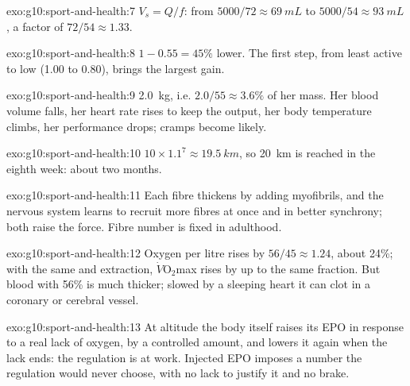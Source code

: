 \begin{solution}{exo:g10:sport-and-health:7}
$V_s = Q/f$: from $5000/72 \approx \qty{69}{mL}$ to $5000/54 \approx
\qty{93}{mL}$, a factor of $72/54 \approx 1.33$.
\end{solution}

\begin{solution}{exo:g10:sport-and-health:8}
$1 - 0.55 = 45\%$ lower. The first step, from least active to low
(1.00 to 0.80), brings the largest gain.
\end{solution}

\begin{solution}{exo:g10:sport-and-health:9}
\qty{2.0}{kg}, i.e. $2.0/55 \approx 3.6\%$ of her mass. Her blood
volume falls, her heart rate rises to keep the output, her body
temperature climbs, her performance drops; cramps become likely.
\end{solution}

\begin{solution}{exo:g10:sport-and-health:10}
$10 \times 1.1^7 \approx \qty{19.5}{km}$, so \qty{20}{km} is reached
in the eighth week: about two months.
\end{solution}

\begin{solution}{exo:g10:sport-and-health:11}
Each fibre thickens by adding myofibrils, and the nervous system learns
to recruit more fibres at once and in better synchrony; both raise the
force. Fibre number is fixed in adulthood.
\end{solution}

\begin{solution}{exo:g10:sport-and-health:12}
Oxygen per litre rises by $56/45 \approx 1.24$, about 24\%; with the
same  and extraction, $\dot V\!\mathrm{O_2}$max rises by
up to the same fraction. But blood with 56\%  is much thicker;
slowed by a sleeping heart it can clot in a coronary or cerebral
vessel.
\end{solution}

\begin{solution}{exo:g10:sport-and-health:13}
At altitude the body itself raises its EPO in response to a real lack
of oxygen, by a controlled amount, and lowers it again when the lack
ends: the regulation is at work. Injected EPO imposes a number the
regulation would never choose, with no lack to justify it and no
brake.
\end{solution}

